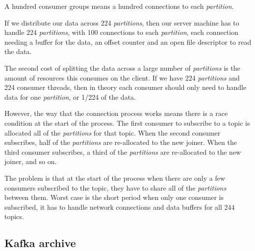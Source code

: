 \documentclass{article}
\newcommand{\kfpartition} {\textit{partition}\xspace}
\newcommand{\kfpartitions} {\textit{partitions}\xspace}
\begin{document}
A hundred consumer groups means a hundred connections to each \kfpartition.

If we distribute our data across 224 \kfpartitions, then our server machine has to handle 224 \kfpartitions, with 100 connections to each \kfpartition, each connection needing a buffer for the data, an offset counter and an open file descriptor to read the data.

The second cost of splitting the data across a large number of \kfpartitions is the amount of resources this consumes on the client.
If we have 224 \kfpartitions and 224 consumer threads, then in theory each consumer should only need to handle data for one \kfpartition, or 1/224 of the data.

However, the way that the connection process works means there is a race condition at the start of the process.
The first consumer to subscribe to a topic is allocated all of the \kfpartitions for that topic.
When the second consumer subscribes, half of the \kfpartitions are re-allocated to the new joiner.
When the third consumer subscribes, a third of the \kfpartitions are re-allocated to the new joiner, and so on.

The problem is that at the start of the process when there are only a few consumers subscribed to the topic,
they have to share all of the \kfpartitions between them. Worst case is the short period when only one
consumer is subscribed, it has to handle network connections and data buffers for all 244 topics.

\subsection{Kafka  archive}
\label{kafka-archive}


\printbibliography
\end{document}
